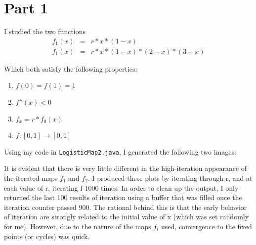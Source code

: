 \documentclass[aps,letterpaper,10pt]{article}
\newcommand{\ttt}{\texttt}
\begin{document}
\section{Part 1}

I studied the two functions 
\begin{eqnarray*}
f_1(x) & = & r * x * (1-x) \\
f_1(x) & = & r * x * (1-x) * (2-x) * (3-x)
\end{eqnarray*}

Which both satisfy the following properties:
\begin{enumerate}
\item $f(0) = f(1) = 1$
\item $f''(x) < 0$
\item $f_x = r * f_0(x)$
\item $f: [0,1]\to [0,1]$
\end{enumerate}

Using my code in \ttt{LogisticMap2.java}, I generated the following two images:

\begin{figure}[!h]
\centering
{}
\label{fig:LogMap}
\end{figure}

It is evident that there is very little different in the high-iteration appearance of the iterated maps $f_1$ and $f_2$. I produced these plots by iterating through r, and at each value of r, iterating f 1000 times. In order to clean up the output, I only returned the last 100 results of iteration using a buffer that was filled once the iteration counter passed 900. The rational behind this is that the early behavior of iteration are strongly related to the initial value of x (which was set randomly for me). However, due to the nature of the maps $f_i$ used, convergence to the fixed points (or cycles) was quick.
\end{document}
